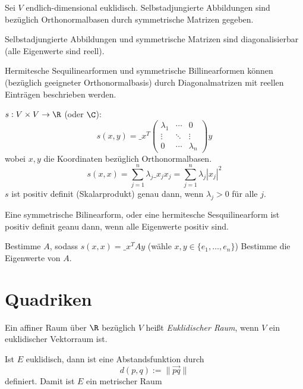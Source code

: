 \documentclass[a4paper, 10pt]{scrbook}
\begin{document}
\begin{kor}
	\label{kor:13.29}
	Sei $V$ endlich-dimensional euklidisch.
	Selbstadjungierte Abbildungen sind bezüglich Orthonormalbasen durch symmetrische Matrizen gegeben.

	Selbstadjungierte Abbildungen und symmetrische Matrizen sind diagonalisierbar (alle Eigenwerte sind reell).
\end{kor}

Hermitesche Sequilinearformen und symmetrische Billinearformen können (bezüglich geeigneter Orthonormalbasis) durch Diagonalmatrizen mit reellen Einträgen beschrieben werden.

$s:V\times V\to \R$ (oder $\C$):
\[
	s(x,y) = \_x^T \begin{pmatrix}\lambda_1 & \cdots & 0 \\ \vdots & \ddots & \vdots \\ 0 &\cdots & \lambda_n\end{pmatrix}y
\]
wobei $x,y$ die Koordinaten bezüglich Orthonormalbasen.
\[
	s(x,x) = \sum_{j=1}^n \lambda_j \_x_j x_j = \sum_{j=1}^n \lambda_j |x_j|^2
\]
$s$ ist positiv definit (Skalarprodukt) genau dann, wenn $\lambda_j > 0$ für alle $j$.

\begin{kor}
	\label{kor:13.30}
	Eine symmetrische Bilinearform, oder eine hermitesche Sesquilinearform ist positiv definit geanu dann, wenn alle Eigenwerte positiv sind.
\end{kor}

\begin{alg*}
	\begin{algorithmic}
		\State Bestimme $A$, sodass $s(x,x) = \_x^TAy$ (wähle $x,y\in \{e_1,\dotsc,e_n\}$)
		\State Bestimme die Eigenwerte von $A$.
	\end{algorithmic}
\end{alg*}


\chapter{Quadriken}


\begin{df}
	\label{df:14.1}
	Ein affiner Raum über $\R$ bezüglich $V$ heißt \emph{Euklidischer Raum}, wenn $V$ ein euklidischer Vektorraum ist.
\end{df}

Ist $E$ euklidisch, dann ist eine Abstandsfunktion durch
\[
	d(p,q) := \|\vec{pq}\|
\]
definiert.
Damit ist $E$ ein metrischer Raum
\end{document}
